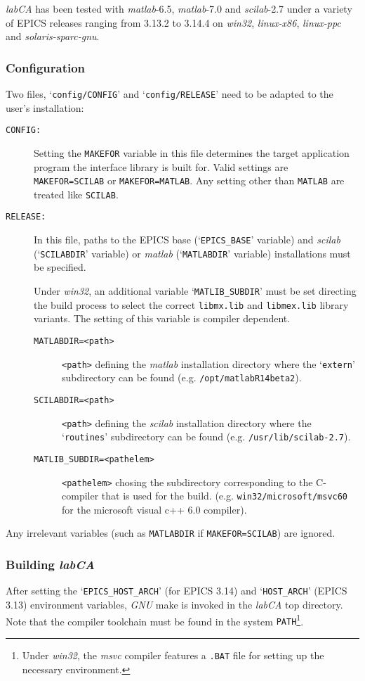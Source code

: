 \documentclass{article}
\newcommand{\sca}{{\em labCA}}
\newcommand{\scilab}{{\em scilab}}
\newcommand{\matlab}{{\em matlab}}
\newcommand{\windoze}{{\em win32}}
\begin{document}
\sca{} has been tested with \matlab-6.5, \matlab-7.0 and \scilab-2.7
under a variety of EPICS releases ranging from 3.13.2
to 3.14.4 on \windoze, {\em linux-x86}, {\em linux-ppc} and
{\em solaris-sparc-gnu}. 

\subsubsection{Configuration}
Two files, `{\tt config/CONFIG}' and `{\tt config/RELEASE}' need to
be adapted to the user's installation:
\begin{description}
\item[\tt CONFIG:] Setting the {\tt MAKEFOR} variable in this file
determines the target application program the interface library is
built for. Valid settings are {\tt MAKEFOR=SCILAB} or {\tt MAKEFOR=MATLAB}.
Any setting other than {\tt MATLAB} are treated like {\tt SCILAB}.
%
%
\item[\tt RELEASE:] In this file, paths to the EPICS base (`{\tt EPICS\_BASE}'
variable) and \scilab{} (`{\tt SCILABDIR}' variable) or \matlab{} (`{\tt MATLABDIR}'
variable) installations must be specified.

Under \windoze{}, an additional variable
`{\tt MATLIB\_SUBDIR}' must be set directing the build process to select the correct
{\tt libmx.lib} and {\tt libmex.lib} library variants. The setting of this variable
is compiler dependent.
\begin{description}
\item[\tt MATLABDIR=<path>] {\tt <path>} defining the \matlab{} installation
directory where the `{\tt extern}' subdirectory can be found (e.g.
{\tt /opt/matlabR14beta2}).
\item[\tt SCILABDIR=<path>] {\tt <path>} defining the \scilab{} installation
directory where the `{\tt routines}' subdirectory can be found (e.g.
{\tt /usr/lib/scilab-2.7}).
\item[\tt MATLIB\_SUBDIR=<pathelem>] {\tt <pathelem>} chosing the subdirectory
corresponding to the C-compiler that is used for the build. (e.g. 
{\tt win32/microsoft/msvc60} for the microsoft visual c++ 6.0 compiler).
\end{description}
\end{description}

Any irrelevant variables (such as {\tt MATLABDIR} if {\tt MAKEFOR=SCILAB})
are ignored.

\subsubsection{Building \sca}
After setting the
`{\tt EPICS\_HOST\_ARCH}' (for EPICS 3.14) and `{\tt HOST\_ARCH}' (EPICS 3.13)
environment variables, {\em GNU} make is invoked in the \sca{} top 
directory. Note that the compiler toolchain must be found in the system
{\tt PATH}\footnote{
Under \windoze, the {\em msvc} compiler features a {\tt .BAT} file for
setting up the necessary environment.
}.
\end{document}
